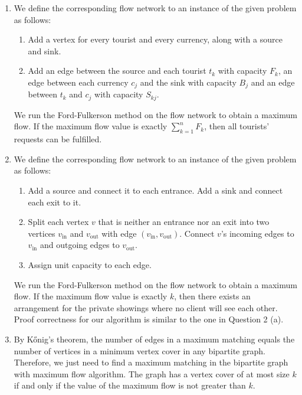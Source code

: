 \documentclass{article}
\begin{document}
\begin{enumerate}[resume]
    \item We define the corresponding flow network to an instance of the given problem as follows:
    \begin{enumerate}
        \item Add a vertex for every tourist and every currency, along with a source and sink.
        \item Add an edge between the source and each tourist $t_k$ with capacity $F_k$, an edge between each currency $c_j$ and the sink with capacity $B_j$ and an edge between $t_k$ and $c_j$ with capacity $S_{kj}$.
    \end{enumerate}

    We run the Ford-Fulkerson method on the flow network to obtain a maximum flow. If the maximum flow value is exactly $\sum_{k = 1}^n F_k$, then all tourists' requests can be fulfilled.

    \item We define the corresponding flow network to an instance of the given problem as follows:
    \begin{enumerate}
        \item Add a source and connect it to each entrance. Add a sink and connect each exit to it.
        \item Split each vertex $v$ that is neither an entrance nor an exit into two vertices $v_\textrm{in}$ and $v_\textrm{out}$ with edge $(v_\textrm{in}, v_\textrm{out})$. Connect $v$'s incoming edges to $v_\textrm{in}$ and outgoing edges to $v_\textrm{out}$.
        \item Assign unit capacity to each edge.
    \end{enumerate}

    We run the Ford-Fulkerson method on the flow network to obtain a maximum flow. If the maximum flow value is exactly $k$, then there exists an arrangement for the private showings where no client will see each other. Proof correctness for our algorithm is similar to the one in Question 2 (a).

    \item By Kőnig's theorem, the number of edges in a maximum matching equals the number of vertices in a minimum vertex cover in any bipartite graph. Therefore, we just need to find a maximum matching in the bipartite graph with maximum flow algorithm. The graph has a vertex cover of at most size $k$ if and only if the value of the maximum flow is not greater than $k$.
\end{enumerate}
\end{document}
